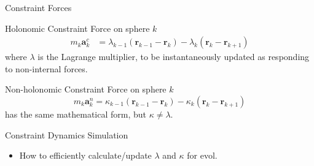 \documentclass[t,presentation]{beamer}
\begin{document}
\begin{frame}[label={sec:org835dbac}]{Constraint Forces}
\begin{block}{Holonomic Constraint Force on sphere \(k\)}
\begin{align}
m_{k}\bm{a}_{k}^{c} & =\lambda_{k-1}\left(\bm{r}_{k-1}-\bm{r}_{k}\right)-\lambda_{k}\left(\bm{r}_{k}-\bm{r}_{k+1}\right)\label{eq:cstr-frc}
\end{align}
where \(\lambda\) is the Lagrange multiplier, to be instantaneously updated as responding to non-internal forces.
\end{block}

\begin{block}{Non-holonomic Constraint Force on sphere \(k\)}
\begin{equation}
m_{k}\bm{a}_{k}^{n}=\kappa_{k-1}\left(\bm{r}_{k-1}-\bm{r}_{k}\right)-\kappa_{k}\left(\bm{r}_{k}-\bm{r}_{k+1}\right)
\end{equation}
has the same mathematical form, but \(\kappa\ne\lambda\).
\end{block}
\begin{block}{Constraint  Dynamics Simulation}
\begin{itemize}
\item How to efficiently calculate/update \(\lambda\) and \(\kappa\) for evol.
\end{itemize}
\end{block}
\end{frame}
\end{document}
